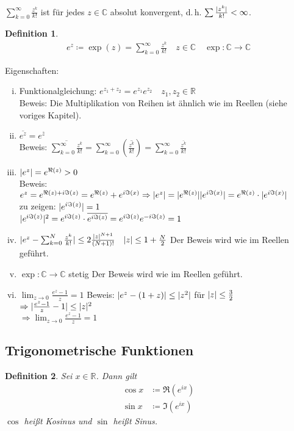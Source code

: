 \documentclass[ngerman,titlepage,twoside, parskip=half*]{scrreprt}
\newcommand*{\R}{\mathbb{R}}
\newcommand*{\C}{\mathbb{C}}
\theoremstyle{break}
\newtheorem{definition}{Definition}[chapter]
\theoremstyle{nonumberbreak}
\DeclarePairedDelimiter{\abs}{\lvert}{\rvert}
\begin{document}
$\sum_{k=0}^\infty \frac{z^k}{k!}$ ist für jedes $z\in\C$ absolut konvergent, d.\,h. $\sum \frac{\abs{z^k}}{k!}
<\infty$.
\begin{definition}
\begin{gather*}e^z\coloneqq\exp(z)=\sum_{k=0}^\infty \frac{z^k}{k!}\quad z\in\C\quad\exp\colon\C\rightarrow\C\end{gather*}
\end{definition}

Eigenschaften:
\begin{enumerate}[(i)]
  \item Funktionalgleichung: $e^{z_1+z_2}=e^{z_1}e^{z_2}\quad z_1,z_2\in\R$\\
    Beweis: Die Multiplikation von Reihen ist ähnlich wie im Reellen (siehe voriges Kapitel).
  \item $\overline{e^z}=e^{\overline{z}}$\\
    Beweis: $\overline{\sum_{k=0}^\infty \frac{z^k}{k!}}=\sum_{k=0}^\infty (\overline{\frac{z^k}{k!}})=
    \sum_{k=0}^\infty \frac{\overline{z^k}}{k!}$
  \item $\abs{e^z}=e^{\Re (z)}>0$\\
    Beweis: $e^z=e^{\Re (z)+i\Im (z)}=e^{\Re (z)}+e^{i\Im (x)}\Rightarrow \abs{e^z}=\abs{e^{\Re (z)}}\abs{e^{i\Im (x)}}
    =e^{\Re (z)}\cdot \abs{e^{i\Im (x)}}$\\
    zu zeigen: $\abs{e^{i\Im (z)}}=1$\\
    $\abs{e^{i\Im (z)}}^2=e^{i\Im (z)}\cdot \overline{e^{i\Im (z)}}=e^{i\Im (z)}e^{-i\Im (z)}=1$
  \item $\abs{e^z-\sum_{k=0}^N \frac{z^k}{k!}}\leq 2\frac{\abs{z}^{N+1}}{(N+1)!}\quad \abs{z}\leq 1+\frac{N}{2}$
    Der Beweis wird wie im Reellen geführt.
  \item $\exp\colon\C\rightarrow\C$ stetig
    Der Beweis wird wie im Reellen geführt.
  \item $\lim_{z\rightarrow 0}\frac{e^z-1}{z}=1$
    Beweis: $\abs{e^z-(1+z)}\leq \abs{z^2}$ für $\abs{z}\leq \frac{3}{2}$\\
    $\Rightarrow \abs{\frac{e^z-1}{z}-1}\leq \abs{z}^2$\\
    $\Rightarrow \lim_{z\rightarrow 0}\frac{{e^z}-1}{z}=1$
\end{enumerate}

\subsection{Trigonometrische Funktionen}
\begin{definition}
Sei $x\in\R$. Dann gilt
\begin{align*}
\cos x & \coloneqq \Re (e^{ix})\\
\sin x & \coloneqq \Im (e^{ix})
\end{align*}
$\cos$ heißt \emph{Kosinus} und $\sin$ heißt \emph{Sinus}.
\end{definition}
\end{document}
